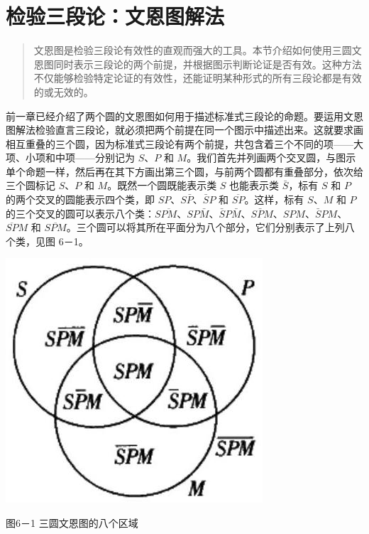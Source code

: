 \section{检验三段论：文恩图解法}

\begin{quotation}
文恩图是检验三段论有效性的直观而强大的工具。本节介绍如何使用三圆文恩图同时表示三段论的两个前提，并根据图示判断论证是否有效。这种方法不仅能够检验特定论证的有效性，还能证明某种形式的所有三段论都是有效的或无效的。
\end{quotation}

前一章已经介绍了两个圆的文恩图如何用于描述标准式三段论的命题。要运用文恩图解法检验直言三段论，就必须把两个前提在同一个图示中描述出来。这就要求画相互重叠的三个圆，因为标准式三段论有两个前提，共包含着三个不同的项——大项、小项和中项——分别记为 $S$、$P$ 和 $M$。我们首先并列画两个交叉圆，与图示单个命题一样，然后再在其下方画出第三个圆，与前两个圆都有重叠部分，依次给三个圆标记 $S$、$P$ 和 $M$。既然一个圆既能表示类 $S$ 也能表示类 $\bar{S}$，标有 $S$ 和 $P$ 的两个交叉的圆能表示四个类，即 $SP$、$S\bar{P}$、$\bar{S}P$ 和 $\overline{SP}$。这样，标有 $S$、$M$ 和 $P$ 的三个交叉的圆可以表示八个类：$S\overline{PM}$、$SP\bar{M}$、$\bar{S}P\bar{M}$、$S\bar{P}M$、$SPM$、$\bar{S}PM$、$\overline{SP}M$ 和 $\overline{SPM}$。三个圆可以将其所在平面分为八个部分，它们分别表示了上列八个类，见图 6－1。

\begin{center}
\includegraphics[width=\textwidth]{images/2025_05_15_6a28331d5e7c993ad07ag-274.jpg}

图6－1 三圆文恩图的八个区域
\end{center}

